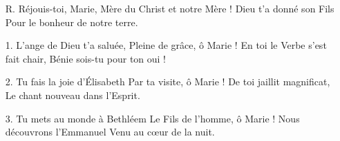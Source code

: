 \begin{itemize}
\item[R.]
Réjouis-toi, Marie,
Mère du Christ et notre Mère !
Dieu t’a donné son Fils
Pour le bonheur de notre terre.
\item[1.]
L’ange de Dieu t’a saluée,
Pleine de grâce, ô Marie !
En toi le Verbe s’est fait chair,
Bénie sois-tu pour ton oui !
\item[2.]
Tu fais la joie d’Élisabeth
Par ta visite, ô Marie !
De toi jaillit magnificat,
Le chant nouveau dans l’Esprit.
\item[3.]
Tu mets au monde à Bethléem
Le Fils de l’homme, ô Marie !
Nous découvrons l’Emmanuel
Venu au cœur de la nuit.
\end{itemize}
